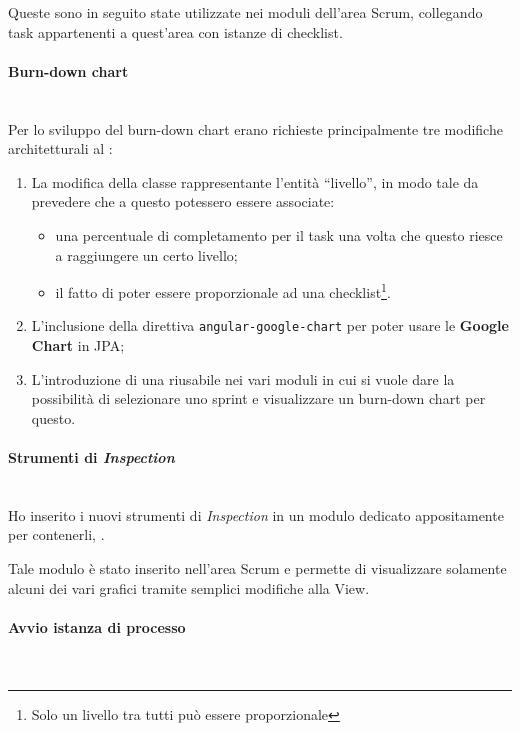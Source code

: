 Queste  sono in seguito state utilizzate nei moduli
dell'area Scrum, collegando task appartenenti a quest'area con istanze di
checklist.

\paragraph{Burn-down chart} \mbox{} \\

Per lo sviluppo del burn-down chart erano richieste principalmente tre
modifiche architetturali al \FREND:

\begin{enumerate}
\item La modifica della classe rappresentante l'entità ``livello'', in modo 
  tale da prevedere che a questo potessero essere associate:
  \begin{itemize}
  \item una percentuale di completamento per il task una volta che questo
    riesce a raggiungere un certo livello;
  \item il fatto di poter essere proporzionale ad una checklist\footnote{Solo
    un livello tra tutti può essere proporzionale}.
  \end{itemize}
\item L'inclusione della direttiva \texttt{angular-google-chart} per poter
  usare le \textbf{Google Chart } in JPA;
\item L'introduzione di una  riusabile nei vari moduli in cui
  si vuole dare la possibilità di selezionare uno sprint e visualizzare un
  burn-down chart per questo.
\end{enumerate}

\paragraph{Strumenti di \emph{Inspection}} \mbox{} \\

Ho inserito i nuovi strumenti di \emph{Inspection} in un modulo dedicato
appositamente per contenerli, .

Tale modulo è stato inserito nell'area Scrum e permette di visualizzare
solamente alcuni dei vari grafici tramite semplici modifiche alla View.

\paragraph{Avvio istanza di processo} \mbox{} \\

